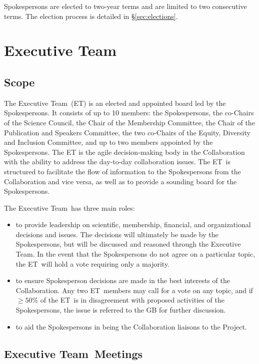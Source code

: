 \documentclass[12pt]{article}
\newcommand{\exec}{{Executive Team}}
\newcommand{\shorte}{{ET}}  %
\begin{document}
Spokespersons are elected to two-year terms and are limited to two consecutive terms. The election process is detailed in \S\ref{sec:elections}. 

\section{\exec}
\label{sec:exec}

\subsection{Scope}

The \exec \ (\shorte) is an elected and appointed board led by the Spokespersons. It consists of up to 10 members: the Spokespersons, the co-Chairs of the Science Council,  the Chair of the Membership Committee, the Chair of the Publication and Speakers Committee, the two co-Chairs of the Equity, Diversity and Inclusion Committee, and up to two members appointed by the Spokespersons. The ET is the agile decision-making body in the Collaboration with the ability to address the day-to-day collaboration issues.  The \shorte\ is structured to facilitate the flow of information to the Spokespersons from the Collaboration and vice versa, as well as to provide a sounding board for the Spokespersons.

The \exec \ has three main roles:
\begin{itemize}
\item to provide leadership on scientific, membership, financial, and organizational decisions and issues. The decisions will ultimately be made by the Spokespersons, but will be discussed and reasoned through the \exec.  In the event that the Spokespersons do not agree on a particular topic, the \shorte\ will hold a vote requiring only a majority.
\item to ensure Spokesperson decisions are made in the best interests of the Collaboration.  Any two \shorte\ members may call for a vote on any topic, and if $\geq 50\%$ of the \shorte\ is in disagreement with proposed activities of the Spokespersons, the issue is referred to the GB for further discussion. 
\item to aid the Spokespersons in being the Collaboration liaisons to the Project.
\end{itemize}

\subsection{\exec \ Meetings}
\end{document}

